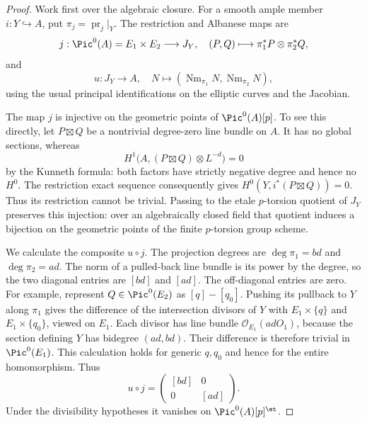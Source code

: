 \begin{proof}
Work first over the algebraic closure.  For a smooth
ample member $i:Y\hookrightarrow A$, put
$\pi_j=\operatorname{pr}_j|_Y$.
The restriction and Albanese maps are
\[
 j:\Pic^0(A)=E_1\times E_2\longrightarrow J_Y,
 \quad (P,Q)\longmapsto\pi_1^*P\otimes\pi_2^*Q,
\]
and
\[
 u:J_Y\longrightarrow A,
       \quad N\longmapsto
            (\operatorname{Nm}_{\pi_1}N,
             \operatorname{Nm}_{\pi_2}N),
\]
using the usual principal identifications on the elliptic
curves and the Jacobian.

The map $j$ is injective on the geometric points of
$\Pic^0(A)[p]$.  To see this directly, let
$P\boxtimes Q$ be a nontrivial degree-zero line bundle
on $A$.  It has no global sections, whereas
\[
 H^1\bigl(A,(P\boxtimes Q)\otimes L^{-d}\bigr)=0
\]
by the Kunneth formula: both factors have strictly
negative degree and hence no $H^0$.
The restriction exact sequence consequently gives
$H^0(Y,i^*(P\boxtimes Q))=0$.
Thus its restriction cannot be trivial.  Passing to
the etale $p$-torsion quotient of $J_Y$ preserves this
injection: over an algebraically closed field that
quotient induces a bijection on the geometric points
of the finite $p$-torsion group scheme.

We calculate the composite $u\circ j$.
The projection degrees are
$\deg\pi_1=bd$ and $\deg\pi_2=ad$.
The norm of a pulled-back line bundle is its power
by the degree, so the two diagonal entries are
$[bd]$ and $[ad]$.
The off-diagonal entries are zero.  For example,
represent $Q\in\Pic^0(E_2)$ as $[q]-[q_0]$.
Pushing its pullback to $Y$ along $\pi_1$ gives the
difference of the intersection divisors of $Y$ with
$E_1\times\{q\}$ and $E_1\times\{q_0\}$, viewed on
$E_1$.  Each divisor has line bundle
$\mathcal O_{E_1}(adO_1)$, because the section defining
$Y$ has bidegree $(ad,bd)$.  Their difference is
therefore trivial in $\Pic^0(E_1)$.
This calculation holds for generic $q,q_0$ and hence
for the entire homomorphism.  Thus
\begin{equation}\label{eq:product-norm-composition}
 u\circ j=\begin{pmatrix}[bd]&0\\0&[ad]\end{pmatrix}.
\end{equation}
Under the divisibility hypotheses it vanishes on
$\Pic^0(A)[p]^{\et}$.


\end{proof}
